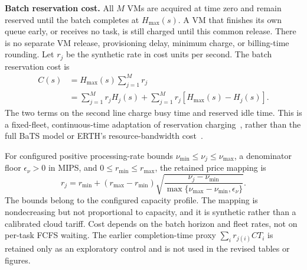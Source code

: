 \textbf{Batch reservation cost.}
All $M$ VMs are acquired at time zero and remain reserved until the batch completes at $H_{\mathrm{max}}(s)$. A VM that finishes its own queue early, or receives no task, is still charged until this common release. There is no separate VM release, provisioning delay, minimum charge, or billing-time rounding. Let $r_j$ be the synthetic rate in cost units per second. The batch reservation cost is
\begin{equation}\label{eq:cost}
\begin{aligned}
C(s)&=H_{\mathrm{max}}(s)\sum_{j=1}^{M}r_j\\
&=\sum_{j=1}^{M}r_jH_j(s)+\sum_{j=1}^{M}r_j[H_{\mathrm{max}}(s)-H_j(s)].
\end{aligned}
\end{equation}
The two terms on the second line charge busy time and reserved idle time. This is a fixed-fleet, continuous-time adaptation of reservation charging~\cite{Oprescu2010}, rather than the full BaTS model or ERTH's resource-bandwidth cost~\cite{Qin2024}.

For configured positive processing-rate bounds $\nu_{\mathrm{min}}\leq\nu_j\leq\nu_{\mathrm{max}}$, a denominator floor $\epsilon_{\nu}>0$ in MIPS, and $0\leq r_{\mathrm{min}}\leq r_{\mathrm{max}}$, the retained price mapping is
\begin{equation}\label{eq:rate}
r_j=r_{\mathrm{min}}+(r_{\mathrm{max}}-r_{\mathrm{min}})\sqrt{\frac{\nu_j-\nu_{\mathrm{min}}}{\max\{\nu_{\mathrm{max}}-\nu_{\mathrm{min}},\epsilon_{\nu}\}}}.
\end{equation}
The bounds belong to the configured capacity profile. The mapping is nondecreasing but not proportional to capacity, and it is synthetic rather than a calibrated cloud tariff. Cost depends on the batch horizon and fleet rates, not on per-task FCFS waiting. The earlier completion-time proxy $\sum_i r_{j(i)}CT_i$ is retained only as an exploratory control and is not used in the revised tables or figures.
